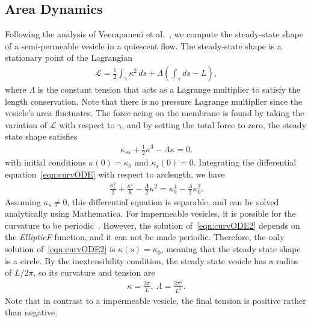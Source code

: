 \documentclass[aps,prl,showpacs]{revtex4}
\begin{document}
\subsection{Area Dynamics}
Following the analysis of Veerapaneni et al.~\cite{vee-raj-bir-pur2009},
we compute the steady-state shape of a semi-permeable vesicle in a
quiescent flow. The steady-state shape is a stationary point of the
Lagrangian
\begin{align}
  \mathcal{L} = \frac{1}{2}\int_{\gamma} \kappa^2 \, ds +
    \Lambda \left(\int_{\gamma} ds  - L \right),
\end{align}
where $\Lambda$ is the constant tension that acts as a Lagrange
multiplier to satisfy the length conservation. Note that there is no
pressure Lagrange multiplier since the vesicle's area fluctuates. The
force acing on the membrane is found by taking the variation of
$\mathcal{L}$ with respect to $\gamma$, and by setting the total force
to zero, the steady state shape satisfies
\begin{align}
  \kappa_{ss} + \frac{1}{2}\kappa^3 - \Lambda \kappa = 0.
  \label{eqn:curvODE}
\end{align}
with initial conditions $\kappa(0) = \kappa_0$ and $\kappa_s(0) = 0$.
Integrating the differential equation~\eqref{eqn:curvODE} with respect
to arclength, we have
\begin{align}
  \frac{\kappa_s^2}{2} + \frac{\kappa^4}{8} - 
    \frac{\Lambda}{2}\kappa^2 = \kappa_0^4 - \frac{\Lambda}{2}\kappa_0^2.
  \label{eqn:curvODE2}
\end{align}
Assuming $\kappa_s \neq 0$, this differential equation is separable, and
can be solved analytically using Mathematica. For impermeable vesicles,
it is possible for the curvature to be
periodic~\cite{vee-raj-bir-pur2009}. However, the solution
of~\eqref{eqn:curvODE2} depends on the {\em EllipticF} function, and it
can not be made periodic. Therefore, the only solution
of~\eqref{eqn:curvODE2} is $\kappa(s) = \kappa_0$, meaning that the
steady state shape is a circle. By the inextensibility condition, the
steady state vesicle has a radius of $L/2\pi$, so its curvature and
tension are
\begin{align}
  \kappa = \frac{2\pi}{L}, \: \Lambda = \frac{2\pi^2}{L^2}.
  \label{eqn:SSshape}
\end{align}
Note that in contrast to a impermeable vesicle, the final tension is
positive rather than negative.
\end{document}
